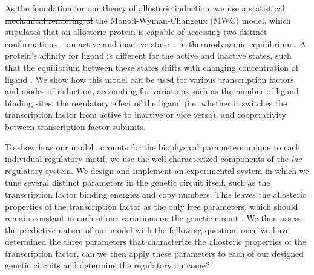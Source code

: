 
\sout{As the foundation for our theory of allosteric induction, we use a
	statistical mechanical rendering of}  the Monod-Wyman-Changeux
(MWC) model, which stipulates that an allosteric protein is capable of accessing
two distinct conformations -- an active and inactive state -- in thermodynamic
equilibrium \cite{MONOD1965}. A protein's affinity for ligand is different for
the active and inactive states, such that the equilibrium between these states
shifts with changing concentration of ligand \cite{Marzen2013}. We show how this
model can be used for various transcription factors and modes of induction,
accounting for variations such as the number of ligand binding sites, the
regulatory effect of the ligand (i.e. whether it switches the transcription
factor from active to inactive or vice versa), and cooperativity
 between transcription factor
subunits. 


To show how our model accounts for the biophysical parameters unique to each
individual regulatory motif, we use the well-characterized components of the
\textit{lac} regulatory system. We design and implement an experimental system
in which we tune several distinct parameters in the genetic circuit itself, such
as the transcription factor binding energies and copy numbers. This leaves the
allosteric properties of the transcription factor as the only free parameters,
which should remain constant in each of our variations on the genetic circuit
. We then assess the predictive nature of our model with the
following question: once we have determined the three parameters  that
characterize the allosteric properties of the transcription factor, can we then
apply these parameters to each of our designed genetic circuits and determine
the regulatory outcome?


